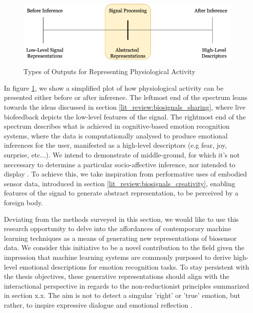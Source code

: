 \begin{figure}[htbp]
	\centering
	\includegraphics[width=1.0\textwidth]{Chapters/Figures/Abstracted_Representations.png}
	\caption{Types of Outputs for Representing Physiological Activity}
	\label{fig:Abstracted_Representations}
\end{figure}

In figure \ref{fig:Abstracted_Representations}, we show a simplified plot of how physiological activity can be presented either before or after inference. The leftmost end of the spectrum leans towards the ideas discussed in section \ref{lit_review:biosignals_sharing}, where live biofeedback depicts the low-level features of the signal. The rightmost end of the spectrum describes what is achieved in cognitive-based emotion recognition systems, where the data is computationally analysed to produce emotional inferences for the user, manifested as a high-level descriptors (e.g fear, joy, surprise, etc...). We intend to demonstrate of middle-ground, for which it's not neccessary to determine a particular socio-affective inference, nor intended to display . To achieve this, we take inspiration from performative uses of embodied sensor data, introduced in section \ref{lit_review:biosignals_creativity}, enabling features of the signal to generate abstract representation, to be perceived by a foreign body.

Deviating from the methods surveyed in this section, we would like to use this research opportunity to delve into the affordances of contemporary machine learning techniques as a means of generating new representations of biosensor data. We consider this initiative to be a novel contribution to the field given the impression that machine learning systems are commonly purposed to derive high-level emotional descriptions for emotion recognition tasks. To stay persistent with the thesis objectives, these generative representations should align with the interactional perspective in regards to the non-reductionist principles summarized in section x.x. The aim is not to detect a singular 'right' or 'true' emotion, but rather, to inspire expressive dialogue and emotional reflection \cite{hook_affective_2009}. 

